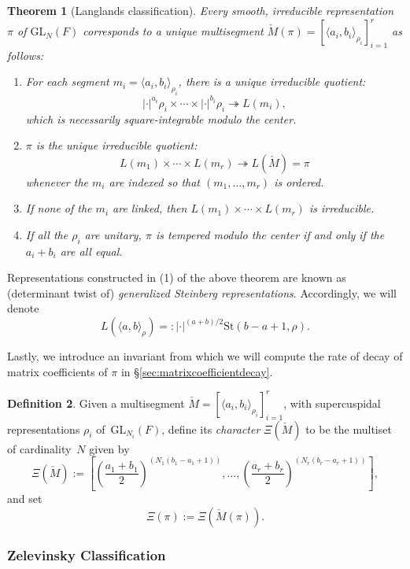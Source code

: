 \documentclass{amsart}
\newcommand{\lf}{\left}
\newcommand{\ri}{\right}
\newcommand{\f}{\frac}
\newcommand{\onto}{\twoheadrightarrow}
\newcommand{\GL}{\mathrm{GL}}
\newcommand{\St}{\mathrm{St}}
\newcommand{\1}{\m 1}
\newtheorem{thm}{Theorem}[subsection]
\theoremstyle{remark}
\theoremstyle{definition}
\newtheorem{dfn}[thm]{Definition}
\numberwithin{equation}{subsection}
\begin{document}
\begin{thm}[Langlands classification]\label{thm:langlandsclassification}
Every smooth, irreducible representation~$\pi$ of $\GL_N(F)$ corresponds to a unique multisegment $\check M(\pi) = [\langle a_i,b_i \rangle_{\rho_i}]_{i=1}^r$ as follows:
\begin{enumerate}
    \item For each segment $m_i = \langle a_i,b_i \rangle_{\rho_i}$, there is a unique irreducible quotient:
    \[
    |\cdot|^{a_i} \rho_i \times \cdots \times |\cdot|^{b_i} \rho_i \onto L(m_i),
    \]
    which is necessarily square-integrable modulo the center. 
    \item $\pi$ is the unique irreducible quotient:
    \[
    L(m_1) \times \cdots \times L(m_r) \onto L(\check M) = \pi
    \]   
    whenever the $m_i$ are indexed so that $(m_1, \dotsc ,m_r)$ is ordered. 
    \item If none of the $m_i$ are linked, then $L(m_1) \times \cdots \times L(m_r)$ is irreducible. %
    \item If all the $\rho_i$ are unitary, $\pi$ is tempered modulo the center if and only if the $a_i + b_i$ are all equal. 
\end{enumerate}
\end{thm}

Representations constructed in (1) of the above theorem are known as (determinant twist of) \emph{generalized Steinberg representations}. Accordingly, we will denote
\[
L(\langle a, b \rangle_{\rho}) =: |\cdot|^{(a+b)/2} \St(b-a + 1, \rho).
\]

Lastly, we introduce an invariant from which we will compute the rate of decay of matrix coefficients of $\pi$ in \S \ref{sec:matrixcoefficientdecay}.
\begin{dfn} \label{def: mainexponent}
Given a multisegment $\check M = [\langle a_i,b_i \rangle_{\rho_i}]_{i=1}^r$, with  supercuspidal representations $\rho_i$ of~$\GL_{N_i}(F)$, define its \emph{character} $\Xi(\check M)$ to be the multiset of cardinality~$N$ given by
\[
\Xi(\check M) := \lf[\lf(\f{a_1 + b_1}2\ri)^{(N_1(b_1 - a_1 + 1))}, \dotsc, \lf(\f{a_r + b_r}2\ri)^{(N_r(b_r - a_r +1))}\ri],
\]
and set
\[
\Xi(\pi) := \Xi(\check M(\pi)). 
\]

\end{dfn}



\subsubsection{Zelevinsky Classification}
\end{document}
